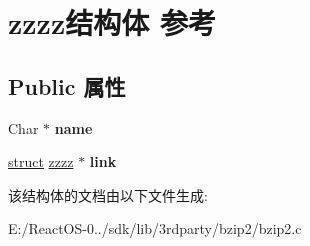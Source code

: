 \hypertarget{structzzzz}{}\section{zzzz结构体 参考}
\label{structzzzz}
\subsection*{Public 属性}
\begin{DoxyCompactItemize}
\item 
\mbox{\label{structzzzz_a934fe2a8af78f77477372732fe35e954}} 
Char $\ast$ {\bfseries name}
\item 
\mbox{\label{structzzzz_a978114e9b920122d882575349496f4cc}} 
\hyperlink{interfacestruct}{struct} \hyperlink{structzzzz}{zzzz} $\ast$ {\bfseries link}
\end{DoxyCompactItemize}


该结构体的文档由以下文件生成\+:\begin{DoxyCompactItemize}
\item 
E\+:/\+React\+O\+S-\/0../sdk/lib/3rdparty/bzip2/bzip2.\+c\end{DoxyCompactItemize}
